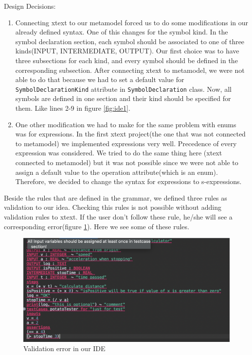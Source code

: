 \documentclass[11pt,fleqn]{article}
\begin{document}
 \noindent{}Design Decisions:
\begin{enumerate}
  \item Connecting xtext to our metamodel forced us to do some modifications in our already defined syntax. One of this 
  changes for the symbol kind. In the symbol declaration section, each symbol should be associated to one of three kinds(INPUT, INTERMEDIATE, OUTPUT).
  Our first choice was to have three subsections for each kind, and every symbol should be defined in the corresponding subsection. After connecting xtext to metamodel, we were not able to do that because we had to set a default value for \lstinline{SymbolDeclarationKind} attribute in \lstinline{SymbolDeclaration} class. Now, all symbols are defined in one section and their kind should be specified for them. Like lines 2-9 in figure \ref{fig:ide1}.
  
  \item
  One other modification we had to make for the same problem with enums was for expressions. In the first xtext project(the one that was not connected to metamodel) we implemented expressions very well. Precedence of every expression was considered. We tried to do the same thing here (xtext connected to metamodel) but it was not possible since we were not able to assign a default value to the operation attribute(which is an enum). Therefore, we decided to change the syntax for expressions to s-expressions.

  
  \end{enumerate}
  
  
Beside the rules that are defined in the grammar, we defined three rules as validation to our idea. Checking this rules is not possible without adding validation rules to xtext. If the user don't follow these rule, he/she will see a corresponding error(figure \ref{fig:ide2}). Here we see some of these rules.

   \begin{figure}[h]
    \centering
    \includegraphics[width=1\textwidth]{ide2.png}
    \caption{Validation error in our IDE}
    \label{fig:ide2}
\end{figure}
\end{document}
